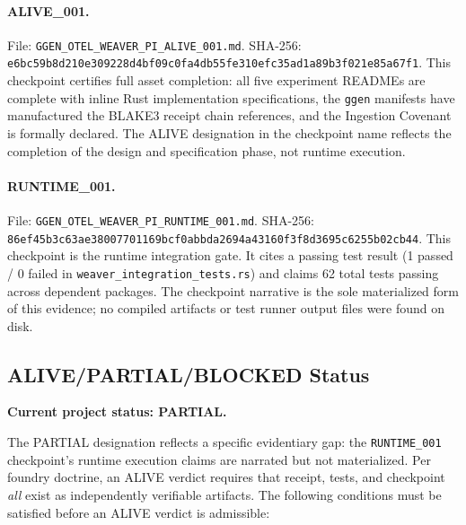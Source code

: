 \paragraph{ALIVE\_001.}
File: \texttt{GGEN\_OTEL\_WEAVER\_PI\_ALIVE\_001.md}.
SHA-256: \texttt{e6bc59b8d210e309228d4bf09c0fa4db55fe310efc35ad1a89b3f021e85a67f1}.
This checkpoint certifies full asset completion: all five experiment READMEs are complete with
inline Rust implementation specifications, the \texttt{ggen} manifests have manufactured the
BLAKE3 receipt chain references, and the Ingestion Covenant is formally declared. The ALIVE
designation in the checkpoint name reflects the completion of the design and specification
phase, not runtime execution.

\paragraph{RUNTIME\_001.}
File: \texttt{GGEN\_OTEL\_WEAVER\_PI\_RUNTIME\_001.md}.
SHA-256: \texttt{86ef45b3c63ae38007701169bcf0abbda2694a43160f3f8d3695c6255b02cb44}.
This checkpoint is the runtime integration gate. It cites a passing test result (1 passed /
0 failed in \texttt{weaver\_integration\_tests.rs}) and claims 62 total tests passing across
dependent packages. The checkpoint narrative is the sole materialized form of this evidence;
no compiled artifacts or test runner output files were found on disk.

\subsection{ALIVE/PARTIAL/BLOCKED Status}
\label{sec:otel-weaver-evidence-status}

\textbf{Current project status: PARTIAL.}

The PARTIAL designation reflects a specific evidentiary gap: the \texttt{RUNTIME\_001}
checkpoint's runtime execution claims are narrated but not materialized. Per foundry doctrine,
an ALIVE verdict requires that receipt, tests, and checkpoint \emph{all} exist as independently
verifiable artifacts. The following conditions must be satisfied before an ALIVE verdict is
admissible:

